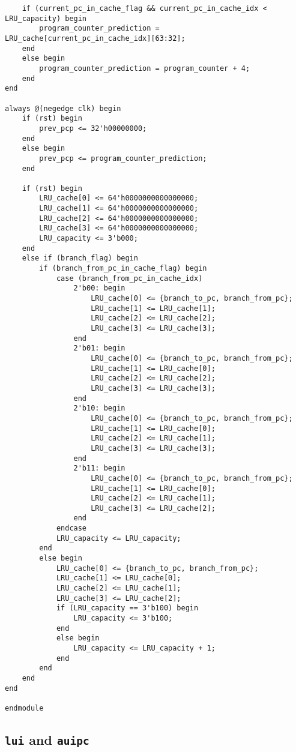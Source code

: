 \documentclass[a4paper,12pt]{article}
\begin{document}
\begin{verbatim}
    if (current_pc_in_cache_flag && current_pc_in_cache_idx < LRU_capacity) begin
        program_counter_prediction = LRU_cache[current_pc_in_cache_idx][63:32];
    end
    else begin
        program_counter_prediction = program_counter + 4;
    end
end

always @(negedge clk) begin
    if (rst) begin
        prev_pcp <= 32'h00000000;
    end
    else begin
        prev_pcp <= program_counter_prediction;
    end

    if (rst) begin
        LRU_cache[0] <= 64'h0000000000000000;
        LRU_cache[1] <= 64'h0000000000000000;
        LRU_cache[2] <= 64'h0000000000000000;
        LRU_cache[3] <= 64'h0000000000000000;
        LRU_capacity <= 3'b000;
    end
    else if (branch_flag) begin
        if (branch_from_pc_in_cache_flag) begin
            case (branch_from_pc_in_cache_idx)
                2'b00: begin
                    LRU_cache[0] <= {branch_to_pc, branch_from_pc};
                    LRU_cache[1] <= LRU_cache[1];
                    LRU_cache[2] <= LRU_cache[2];
                    LRU_cache[3] <= LRU_cache[3];
                end
                2'b01: begin
                    LRU_cache[0] <= {branch_to_pc, branch_from_pc};
                    LRU_cache[1] <= LRU_cache[0];
                    LRU_cache[2] <= LRU_cache[2];
                    LRU_cache[3] <= LRU_cache[3];
                end
                2'b10: begin
                    LRU_cache[0] <= {branch_to_pc, branch_from_pc};
                    LRU_cache[1] <= LRU_cache[0];
                    LRU_cache[2] <= LRU_cache[1];
                    LRU_cache[3] <= LRU_cache[3];
                end
                2'b11: begin
                    LRU_cache[0] <= {branch_to_pc, branch_from_pc};
                    LRU_cache[1] <= LRU_cache[0];
                    LRU_cache[2] <= LRU_cache[1];
                    LRU_cache[3] <= LRU_cache[2];
                end
            endcase
            LRU_capacity <= LRU_capacity;
        end
        else begin
            LRU_cache[0] <= {branch_to_pc, branch_from_pc};
            LRU_cache[1] <= LRU_cache[0];
            LRU_cache[2] <= LRU_cache[1];
            LRU_cache[3] <= LRU_cache[2];
            if (LRU_capacity == 3'b100) begin
                LRU_capacity <= 3'b100;
            end
            else begin
                LRU_capacity <= LRU_capacity + 1;
            end
        end
    end
end

endmodule
\end{verbatim}

\subsection{\texttt{lui} and \texttt{auipc}}
\end{document}
